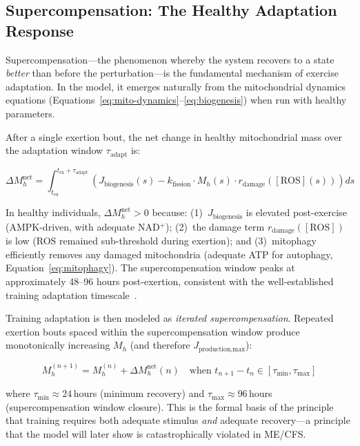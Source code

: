\subsection{Supercompensation: The Healthy Adaptation Response}
\label{sec:supercompensation}

Supercompensation---the phenomenon whereby the system recovers to a state \emph{better} than before the perturbation---is the fundamental mechanism of exercise adaptation. In the model, it emerges naturally from the mitochondrial dynamics equations (Equations~\ref{eq:mito-dynamics}--\ref{eq:biogenesis}) when run with healthy parameters.

After a single exertion bout, the net change in healthy mitochondrial mass over the adaptation window $\tau_{\text{adapt}}$ is:

\begin{equation}
\label{eq:supercompensation}
\Delta M_h^{\text{net}} = \int_{t_{\text{ex}}}^{t_{\text{ex}} + \tau_{\text{adapt}}} \left( J_{\text{biogenesis}}(s) - k_{\text{fission}} \cdot M_h(s) \cdot r_{\text{damage}}([\text{ROS}](s)) \right) ds
\end{equation}

In healthy individuals, $\Delta M_h^{\text{net}} > 0$ because: (1)~$J_{\text{biogenesis}}$ is elevated post-exercise (AMPK-driven, with adequate NAD$^+$); (2)~the damage term $r_{\text{damage}}([\text{ROS}])$ is low (ROS remained sub-threshold during exertion); and (3)~mitophagy efficiently removes any damaged mitochondria (adequate ATP for autophagy, Equation~\ref{eq:mitophagy}). The supercompensation window peaks at approximately 48--96 hours post-exertion, consistent with the well-established training adaptation timescale~\cite{Hood2009biogenesis,Coffey2017adaptation}.

Training adaptation is then modeled as \emph{iterated supercompensation}. Repeated exertion bouts spaced within the supercompensation window produce monotonically increasing $M_h$ (and therefore $J_{\text{production,max}}$):

\begin{equation}
\label{eq:training-adaptation}
M_h^{(n+1)} = M_h^{(n)} + \Delta M_h^{\text{net}}(n) \quad \text{when } t_{n+1} - t_n \in [\tau_{\text{min}}, \tau_{\text{max}}]
\end{equation}

where $\tau_{\text{min}} \approx 24$\,hours (minimum recovery) and $\tau_{\text{max}} \approx 96$\,hours (supercompensation window closure). This is the formal basis of the principle that training requires both adequate stimulus \emph{and} adequate recovery---a principle that the model will later show is catastrophically violated in ME/CFS.

